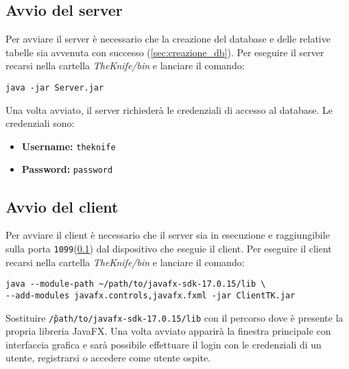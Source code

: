 \subsection{Avvio del server}
\label{sec:avvio_server}
Per avviare il server è necessario che la creazione del database 
e delle relative tabelle sia avvenuta con successo 
(\ref{sec:creazione_db}).
Per eseguire il server recarsi nella cartella \textit{TheKnife/bin} 
e lanciare il comando:
\begin{verbatim}
java -jar Server.jar
\end{verbatim}
Una volta avviato, il server richiederà le credenziali di accesso al database.
Le credenziali sono:
\begin{itemize}
    \item \textbf{Username:} \texttt{theknife}
    \item \textbf{Password:} \texttt{password}
\end{itemize}

\subsection{Avvio del client}
\label{sec:avvio_client}
Per avviare il client è necessario che il server sia in esecuzione
e raggiungibile sulla porta \texttt{1099}(\ref{sec:avvio_server}) dal dispositivo che 
eseguie il client.
Per eseguire il client recarsi nella cartella \textit{TheKnife/bin} 
e lanciare il comando:
\begin{verbatim}
java --module-path ~/path/to/javafx-sdk-17.0.15/lib \
--add-modules javafx.controls,javafx.fxml -jar ClientTK.jar
\end{verbatim}
Sostituire \texttt{\~/path/to/javafx-sdk-17.0.15/lib} con 
il percorso dove è presente la propria libreria JavaFX.
Una volta avviato apparirà la finestra principale con interfaccia grafica
e sarà possibile effettuare il login con le credenziali di un utente, 
registrarsi o accedere come utente ospite.
